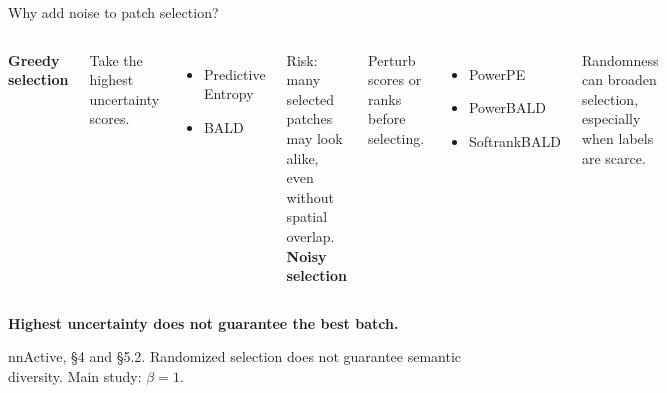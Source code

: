 \documentclass[aspectratio=169,11pt]{beamer}
\newcommand{\source}[1]{\vfill{\color{Muted}\fontsize{7}{9}\selectfont #1\par}}
\newcommand{\takeaway}[1]{\vspace{0.2cm}\begin{center}{\color{Accent}\large\bfseries #1}\end{center}}
\begin{document}
\begin{frame}{Why add noise to patch selection?}
\begin{columns}[T,onlytextwidth]
{\color{Accent}\large\textbf{Greedy selection}}\par\vspace{.25cm}
Take the highest uncertainty scores.\par\vspace{.2cm}
\begin{itemize}\item Predictive Entropy\item BALD\end{itemize}
\vspace{.2cm}Risk: many selected patches may look alike, even without spatial overlap.
{\color{Teal}\large\textbf{Noisy selection}}\par\vspace{.25cm}
Perturb scores or ranks before selecting.\par\vspace{.2cm}
\begin{itemize}\item PowerPE\item PowerBALD\item SoftrankBALD\end{itemize}
\vspace{.2cm}Randomness can broaden selection, especially when labels are scarce.
\end{columns}
\takeaway{Highest uncertainty does not guarantee the best batch.}
\source{nnActive, \S4 and \S5.2. Randomized selection does not guarantee semantic diversity. Main study: $\beta=1$.}
\end{frame}



\end{document}
